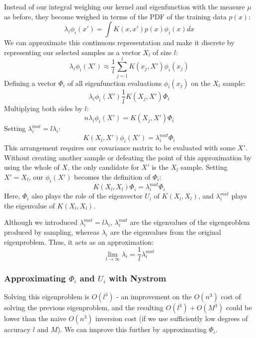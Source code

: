 Instead of our integral weighing our kernel and eigenfunction with the measure $\mu$ as before, they become weighed in terms of the PDF of the training data $p(x)$:
\begin{equation*}
    \lambda_i \phi_i(x') = \int K(x, x') p(x) \phi_i(x) dx
\end{equation*}
We can approximate this continuous representation and make it discrete by representing our selected samples as a vector $X_l$ of size $l$:
\begin{equation*}
    \lambda_i \phi_i(X') \approx \frac{1}{l} \sum_{j=1}^{l} K(x_j, X') \phi_i(x_j)
\end{equation*}
Defining a vector $\Phi_i$ of all eigenfunction evaluations $\phi_i(x_j)$ on the $X_l$ sample:
\begin{equation*}
    \lambda_i \phi_i(X') \frac{1}{l} K(X_j, X') \Phi_i
\end{equation*}
Multiplying both sides by $l$:
\begin{equation*}
    n \lambda_i \phi_i(X') = K(X_j, X') \Phi_i
\end{equation*}
Setting $\lambda_i^{mat} = l \lambda_i$:
\begin{equation*}
    K(X_l, X') \phi_i(X') = \lambda_i^{mat} \Phi_i
\end{equation*}
This arrangement requires our covariance matrix to be evaluated with some $X'$. Without creating another sample or defeating the point of this approximation by using the whole of $X$, the only candidate for $X'$ is the $X_l$ sample. Setting $X' = X_l$, our $\phi_i(X')$ becomes the definition of $\Phi_i$:
\begin{equation*}
    K(X_l, X_l) \Phi_i = \lambda_i^{mat} \Phi_i
\end{equation*}
Here, $\Phi_i$ also plays the role of the eigenvector $U_i$ of $K(X_l, X_l)$, and $\lambda_i^{mat}$ plays the eigenvalue of $K(X_l, X_l)$. 

Although we introduced $\lambda_i^{mat} = l \lambda_i$, $\lambda_i^{mat}$ are the eigenvalues of the eigenproblem produced by sampling, whereas $\lambda_i$ are the eigenvalues from the original eigenproblem. Thus, it acts as an approximation:
\begin{equation*}
    \lim_{l \to \infty} \lambda_i = \frac{1}{l} \lambda_i^{mat} 
\end{equation*}

\subsubsection{Approximating $\Phi_i$ and $U_i$ with Nystrom}
Solving this eigenproblem is $O(l^3)$ - an improvement on the $O(n^3)$ cost of solving the previous eigenproblem, and the resulting $O(l^3) + O(M^3)$ could be lower than the naive $O(n^3)$ inversion cost (if we use sufficiently low degrees of accuracy $l$ and $M$). We can improve this further by approximating $\Phi_i$.

